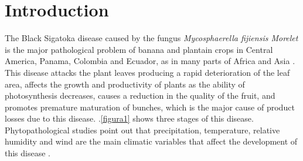 \documentclass[review]{elsarticle}
\begin{document}
\section{Introduction}
The Black Sigatoka disease caused by the fungus {\it Mycosphaerella fijiensis Morelet} is the major pathological problem of banana and plantain crops in Central America, Panama, Colombia and Ecuador, as in many parts of Africa and Asia \citep{MarinVargas1995}.\\
This disease attacks the plant leaves producing a rapid deterioration of the leaf area, affects the growth and productivity of plants as the ability of photosynthesis decreases, causes a reduction in the quality of the fruit, and promotes premature maturation of bunches, which is the major cause of product losses due to this disease. \figurename $.$\ref{figura1} shows three stages of this disease.\\
Phytopathological studies point out that precipitation, temperature, relative humidity and wind are the main climatic variables that affect the development of this disease \citep{MarinVargas1995}.\\ 	 	 
\end{document}
